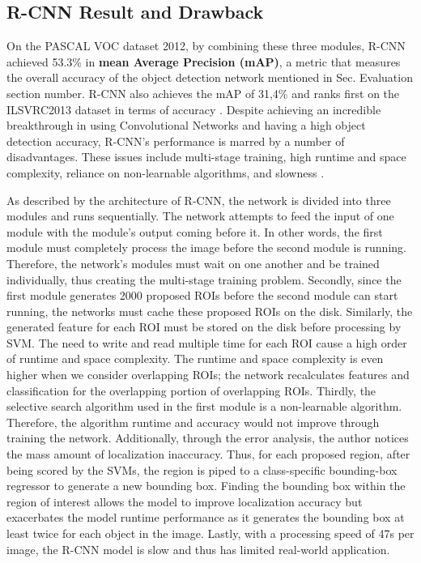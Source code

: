 \subsection{R-CNN Result and Drawback}
On the PASCAL VOC dataset 2012, by combining these three modules, R-CNN achieved 53.3\% in \textbf{mean Average Precision (mAP)}, a metric that measures the overall accuracy of the object detection network mentioned in Sec. {\color{red} Evaluation section number}. R-CNN also achieves the mAP of 31,4\% and ranks first on the ILSVRC2013 dataset in terms of accuracy \cite{Girshick_R_CNN_2013}. Despite achieving an incredible breakthrough in using Convolutional Networks and having a high object detection accuracy, R-CNN's performance is marred by a number of disadvantages. These issues include multi-stage training, high runtime and space complexity, reliance on non-learnable algorithms, and slowness \cite{fast_rcnn_og}. 

As described by the architecture of R-CNN, the network is divided into three modules and runs sequentially. The network attempts to feed the input of one module with the module's output coming before it. In other words, the first module must completely process the image before the second module is running. Therefore, the network's modules must wait on one another and be trained individually, thus creating the multi-stage training problem. Secondly, since the first module generates 2000 proposed ROIs before the second module can start running, the networks must cache these proposed ROIs on the disk. Similarly, the generated feature for each ROI must be stored on the disk before processing by SVM. The need to write and read multiple time for each ROI cause a high order of runtime and space complexity. The runtime and space complexity is even higher when we consider overlapping ROIs; the network recalculates features and classification for the overlapping portion of overlapping ROIs. Thirdly, the selective search algorithm used in the first module is a non-learnable algorithm. Therefore, the algorithm runtime and accuracy would not improve through training the network. Additionally, through the error analysis, the author notices the mass amount of localization inaccuracy. Thus, for each proposed region, after being scored by the SVMs, the region is piped to a class-speciﬁc bounding-box regressor to generate a new bounding box. Finding the bounding box within the region of interest allows the model to improve localization accuracy but exacerbates the model runtime performance as it generates the bounding box at least twice for each object in the image. Lastly, with a processing speed of 47s per image, the R-CNN model is slow and thus has limited real-world application.